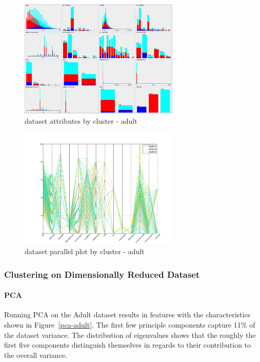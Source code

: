 \documentclass{sig-alternate}
\begin{document}
\begin{figure}[!htbp]
    \centering
    \includegraphics[width=3in]{part2/adult/attr-cluster.pdf}
    \caption{dataset attributes by cluster - adult\label{adult-attr-cluster}}
\end{figure} 

\begin{figure}[!htbp]
    \centering
    \includegraphics[width=3in]{part2/adult/parallel-cluster.pdf}
    \caption{dataset parallel plot by cluster - adult\label{adult-parallel-cluster}}
\end{figure} 


\subsubsection{Clustering on Dimensionally Reduced Dataset}


\paragraph{PCA}
Running PCA on the Adult dataset results in features with the characteristics shown in Figure~\ref{pca-adult}. The first few principle components capture 11\% of the dataset variance. The distribution of eigenvalues shows that the roughly the first five components distinguish themselves in regards to their contribution to the overall variance.
\end{document}
